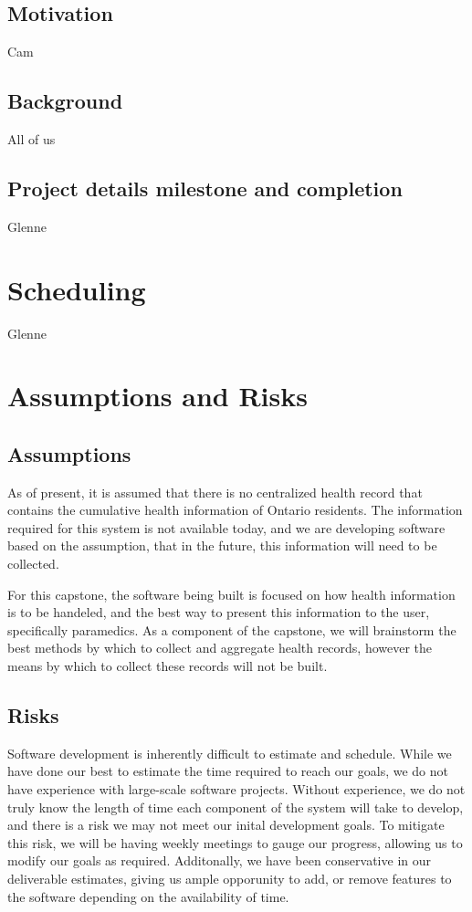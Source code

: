 \documentclass{article}
\begin{document}
\subsection{Motivation}
Cam
\subsection{Background}
All of us
\subsection{Project details milestone and completion}
Glenne
\section{Scheduling}
Glenne
\section{Assumptions and Risks}

\subsection{Assumptions}

As of present, it is assumed that there is no centralized health record that contains the cumulative health information of Ontario residents. The information required for this system is not available today, and we are developing software based on the assumption, that in the future, this information will need to be collected.

For this capstone, the software being built is focused on how health information is to be handeled, and the best way to present this information to the user, specifically paramedics. As a component of the capstone, we will brainstorm the best methods by which to collect and aggregate health records, however the means by which to collect these records will not be built.

\subsection{Risks}

Software development is inherently difficult to estimate and schedule. While we have done our best to estimate the time required to reach our goals, we do not have experience with large-scale software projects. Without experience, we do not truly know the length of time each component of the system will take to develop, and there is a risk we may not meet our inital development goals. To mitigate this risk, we will be having weekly meetings to gauge our progress, allowing us to modify our goals as required. Additonally, we have been conservative in our deliverable estimates, giving us ample opporunity to add, or remove features to the software depending on the availability of time.
\end{document}

